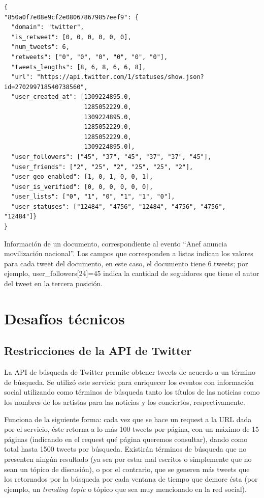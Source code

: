 \begin{listing}
\begin{verbatim}
{
"850a0f7e08e9cf2e080678679857eef9": {
  "domain": "twitter",
  "is_retweet": [0, 0, 0, 0, 0, 0],
  "num_tweets": 6,
  "retweets": ["0", "0", "0", "0", "0", "0"],
  "tweets_lengths": [8, 6, 8, 6, 6, 8],
  "url": "https://api.twitter.com/1/statuses/show.json?id=270299718540738560",
  "user_created_at": [1309224895.0,
                      1285052229.0,
                      1309224895.0,
                      1285052229.0,
                      1285052229.0,
                      1309224895.0],
  "user_followers": ["45", "37", "45", "37", "37", "45"],
  "user_friends": ["2", "25", "2", "25", "25", "2"],
  "user_geo_enabled": [1, 0, 1, 0, 0, 1],
  "user_is_verified": [0, 0, 0, 0, 0, 0],
  "user_lists": ["0", "1", "0", "1", "1", "0"],
  "user_statuses": ["12484", "4756", "12484", "4756", "4756", "12484"]}
}
\end{verbatim}
\caption{Información de un documento, correspondiente al evento ``Anef
anuncia movilización nacional''. Los campos que corresponden a listas
indican los valores para cada tweet del documento, en este caso, el
documento tiene 6 tweets; por ejemplo, user\_followers[24]=45 indica
la cantidad de seguidores que tiene el autor del tweet en la tercera
posición.}
\label{fig:doc-example}
\end{listing}






\section{Desafíos técnicos}
\label{sec-4.3}

\subsection{Restricciones de la API de Twitter}
\label{sec-4.3.1}


   La API de búsqueda de Twitter permite obtener tweets de acuerdo a un
   término de búsqueda. Se utilizó este servicio para enriquecer los
   eventos con información social utilizando como términos de búsqueda
   tanto los títulos de las noticias como los nombres de los artistas
   para las noticias y los conciertos, respectivamente.

   Funciona de la siguiente forma: cada vez que se hace un request a la
   URL dada por el servicio, éste retorna a lo más 100 tweets por página, con un
   máximo de 15 páginas (indicando en el request qué página queremos
   consultar), dando como total hasta 1500 tweets por búsqueda. Existirán
   términos de búsqueda que no presenten ningún resultado  (ya sea por
   estar mal escritos o simplemente que no sean un tópico de discusión), o por
   el contrario, que se generen más tweets que los retornados por la
   búsqueda por cada ventana de tiempo que demore ésta (por ejemplo, un
   \emph{trending topic} o tópico que sea muy mencionado en la red social).

